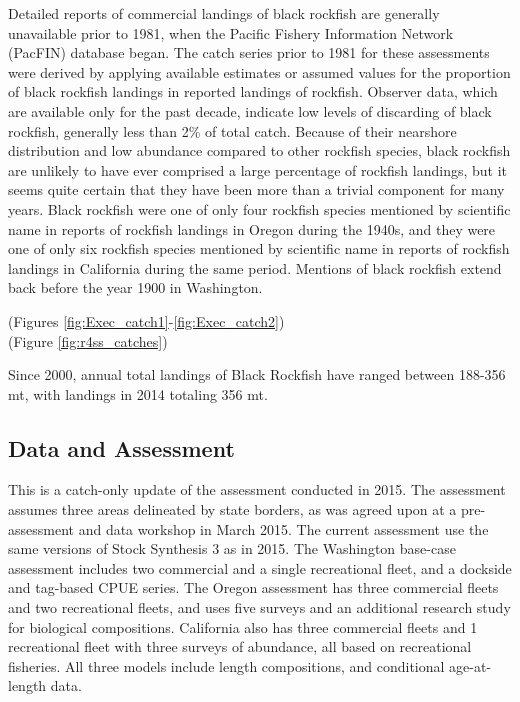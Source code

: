 \documentclass[12pt,]{article}
\begin{document}
Detailed reports of commercial landings of black rockfish are generally
unavailable prior to 1981, when the Pacific Fishery Information Network
(PacFIN) database began. The catch series prior to 1981 for these
assessments were derived by applying available estimates or assumed
values for the proportion of black rockfish landings in reported
landings of rockfish. Observer data, which are available only for the
past decade, indicate low levels of discarding of black rockfish,
generally less than 2\% of total catch. Because of their nearshore
distribution and low abundance compared to other rockfish species, black
rockfish are unlikely to have ever comprised a large percentage of
rockfish landings, but it seems quite certain that they have been more
than a trivial component for many years. Black rockfish were one of only
four rockfish species mentioned by scientific name in reports of
rockfish landings in Oregon during the 1940s, and they were one of only
six rockfish species mentioned by scientific name in reports of rockfish
landings in California during the same period. Mentions of black
rockfish extend back before the year 1900 in Washington.

(Figures \ref{fig:Exec_catch1}-\ref{fig:Exec_catch2})\\
(Figure \ref{fig:r4ss_catches})

Since 2000, annual total landings of Black Rockfish have ranged between
188-356 mt, with landings in 2014 totaling 356 mt.

\subsection*{Data and Assessment}\label{data-and-assessment}

This is a catch-only update of the assessment conducted in 2015. The
assessment assumes three areas delineated by state borders, as was
agreed upon at a pre-assessment and data workshop in March 2015. The
current assessment use the same versions of Stock Synthesis 3 as in
2015. The Washington base-case assessment includes two commercial and a
single recreational fleet, and a dockside and tag-based CPUE series. The
Oregon assessment has three commercial fleets and two recreational
fleets, and uses five surveys and an additional research study for
biological compositions. California also has three commercial fleets and
1 recreational fleet with three surveys of abundance, all based on
recreational fisheries. All three models include length compositions,
and conditional age-at-length data.
\end{document}
